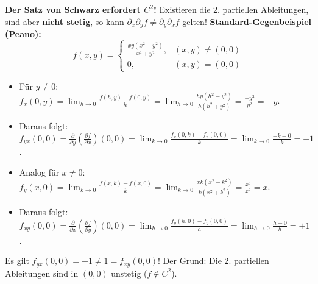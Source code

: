 \begin{example}
    \textbf{Der Satz von Schwarz erfordert $C^2$!}
    Existieren die 2. partiellen Ableitungen, sind aber \textbf{nicht stetig}, so kann $\partial_x \partial_y f \neq \partial_y \partial_x f$ gelten!
    \textbf{Standard-Gegenbeispiel (Peano):}
    $$ f(x, y) = \begin{cases} \frac{x y (x^2 - y^2)}{x^2 + y^2}, & (x, y) \neq (0, 0) \\ 0, & (x, y) = (0, 0) \end{cases} $$
    \begin{itemize}
        \item Für $y \neq 0$: $f_x(0, y) = \lim_{h \to 0} \frac{f(h, y) - f(0, y)}{h} = \lim_{h \to 0} \frac{h y (h^2 - y^2)}{h (h^2 + y^2)} = \frac{-y^3}{y^2} = -y$.
        \item Daraus folgt: $f_{yx}(0, 0) = \frac{\partial}{\partial y} \left( \frac{\partial f}{\partial x} \right)(0, 0) = \lim_{k \to 0} \frac{f_x(0, k) - f_x(0, 0)}{k} = \lim_{k \to 0} \frac{-k - 0}{k} = -1$.
        \item Analog für $x \neq 0$: $f_y(x, 0) = \lim_{k \to 0} \frac{f(x, k) - f(x, 0)}{k} = \lim_{k \to 0} \frac{x k (x^2 - k^2)}{k (x^2 + k^2)} = \frac{x^3}{x^2} = x$.
        \item Daraus folgt: $f_{xy}(0, 0) = \frac{\partial}{\partial x} \left( \frac{\partial f}{\partial y} \right)(0, 0) = \lim_{h \to 0} \frac{f_y(h, 0) - f_y(0, 0)}{h} = \lim_{h \to 0} \frac{h - 0}{h} = +1$.
    \end{itemize}
    Es gilt $f_{yx}(0, 0) = -1 \neq 1 = f_{xy}(0, 0)$! Der Grund: Die 2. partiellen Ableitungen sind in $(0, 0)$ unstetig ($f \notin C^2$).
\end{example}

